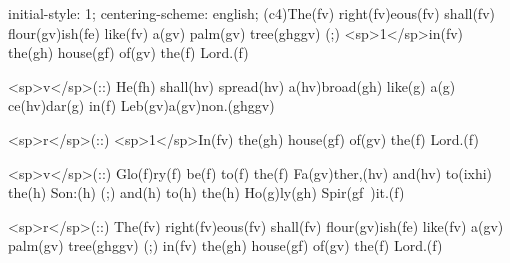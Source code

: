 initial-style: 1;
centering-scheme: english;
(c4)The(fv) right(fv)eous(fv) shall(fv) flour(gv)ish(fe) like(fv) a(gv) palm(gv) tree(ghggv) (;) <sp>1</sp>in(fv) the(gh) house(gf) of(gv) the(f) Lord.(f)

<sp>v</sp>(::) He(fh) shall(hv) spread(hv) a(hv)broad(gh) like(g) a(g) ce(hv)dar(g) in(f) Leb(gv)a(gv)non.(ghggv)

<sp>r</sp>(::) <sp>1</sp>In(fv) the(gh) house(gf) of(gv) the(f) Lord.(f)

<sp>v</sp>(::) Glo(f)ry(f) be(f) to(f) the(f) Fa(gv)ther,(hv) and(hv) to(ixhi) the(h) Son:(h) (;) and(h) to(h) the(h) Ho(g)ly(gh) Spir(gf~)it.(f)

<sp>r</sp>(::) The(fv) right(fv)eous(fv) shall(fv) flour(gv)ish(fe) like(fv) a(gv) palm(gv) tree(ghggv) (;) in(fv) the(gh) house(gf) of(gv) the(f) Lord.(f)